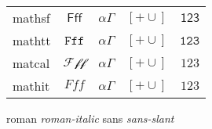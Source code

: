 \documentclass{article}
\def\ltrs{Fff}
\def\grk{\alpha \Gamma}
\def\sym{[+\cup]}
\def\num{123}
\begin{document}
\begin{tabular}{lcccr}
mathsf  & {\boldmath   $\mathsf{\ltrs}$ } & {\boldmath  $\mathsf{\grk}$ } & {\boldmath  $\mathsf{\sym}$ } & {\boldmath  $\mathsf{\num}$ }\\
mathtt  & {\boldmath   $\mathtt{\ltrs}$ } & {\boldmath  $\mathtt{\grk}$ } & {\boldmath  $\mathtt{\sym}$ } & {\boldmath  $\mathtt{\num}$ }\\
matcal  & {\boldmath   $\mathcal{\ltrs}$ } & {\boldmath  $\mathcal{\grk}$ } & {\boldmath  $\mathcal{\sym}$ } & {\boldmath  $\mathcal{\num}$ }\\
mathit  & {\boldmath   $\mathit{\ltrs}$ } & {\boldmath  $\mathit{\grk}$ } & {\boldmath  $\mathit{\sym}$ } & {\boldmath  $\mathit{\num}$ } \\
\end{tabular}

{\rm roman {\it roman-italic}}  {\sffamily sans {\slshape sans-slant}}
\end{document}
